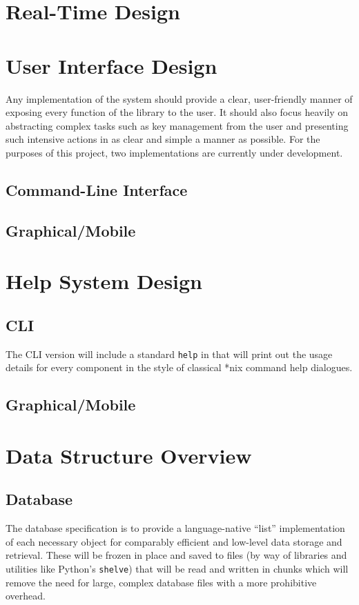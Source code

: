 \documentclass[titlepage]{report}
\begin{document}
\section{Real-Time Design}

\section{User Interface Design}
Any implementation of the system should provide a clear, user-friendly manner of exposing every function of the library to the user. It should also focus heavily on abstracting complex tasks such as key management from the user and presenting such intensive actions in as clear and simple a manner as possible. For the purposes of this project, two implementations are currently under development.

\subsection{Command-Line Interface}

\subsection{Graphical/Mobile}

\section{Help System Design}

\subsection{CLI}
The CLI version will include a standard \verb|help| in that will print out the usage details for every component in the style of classical *nix command help dialogues. 

\subsection{Graphical/Mobile}

\section{Data Structure Overview}
\subsection{Database}
The database specification is to provide a language-native ``list'' implementation of each necessary object for comparably efficient and low-level data storage and retrieval. These will be frozen in place and saved to files (by way of libraries and utilities like Python's \texttt{shelve}) that will be read and written in chunks which will remove the need for large, complex database files with a more prohibitive overhead.
\end{document}
